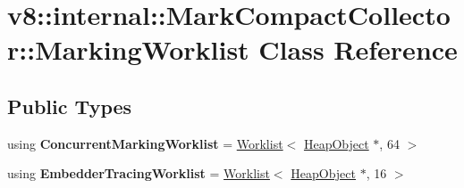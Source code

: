 \hypertarget{classv8_1_1internal_1_1MarkCompactCollector_1_1MarkingWorklist}{}\section{v8\+:\+:internal\+:\+:Mark\+Compact\+Collector\+:\+:Marking\+Worklist Class Reference}
\label{classv8_1_1internal_1_1MarkCompactCollector_1_1MarkingWorklist}
\subsection*{Public Types}
\begin{DoxyCompactItemize}
\item 
\mbox{\label{classv8_1_1internal_1_1MarkCompactCollector_1_1MarkingWorklist_a0acb2acefe01fdaa7af10a33f00638a1}} 
using {\bfseries Concurrent\+Marking\+Worklist} = \mbox{\hyperlink{classv8_1_1internal_1_1Worklist}{Worklist}}$<$ \mbox{\hyperlink{classv8_1_1internal_1_1HeapObject}{Heap\+Object}} $\ast$, 64 $>$
\item 
\mbox{\label{classv8_1_1internal_1_1MarkCompactCollector_1_1MarkingWorklist_a668bf78225f2e08c038c9dd0e7aa3fef}} 
using {\bfseries Embedder\+Tracing\+Worklist} = \mbox{\hyperlink{classv8_1_1internal_1_1Worklist}{Worklist}}$<$ \mbox{\hyperlink{classv8_1_1internal_1_1HeapObject}{Heap\+Object}} $\ast$, 16 $>$
\end{DoxyCompactItemize}
